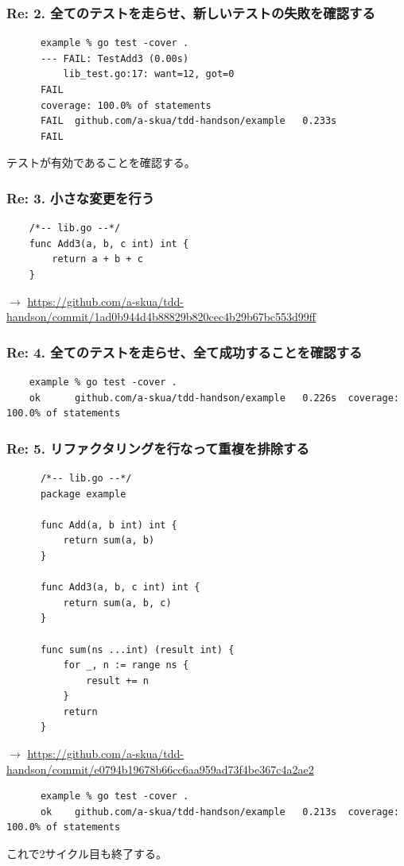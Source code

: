 \documentclass[aspectratio=169]{beamer}
\begin{document}
\begin{frame}[fragile]\frametitle{Re: 2. 全てのテストを走らせ、新しいテストの失敗を確認する}
  {
    \scriptsize
    \begin{verbatim}
      example % go test -cover .
      --- FAIL: TestAdd3 (0.00s)
          lib_test.go:17: want=12, got=0
      FAIL
      coverage: 100.0% of statements
      FAIL	github.com/a-skua/tdd-handson/example	0.233s
      FAIL
    \end{verbatim}
  }

  テストが有効であることを確認する。
\end{frame}

\begin{frame}[fragile]\frametitle{Re: 3. 小さな変更を行う}
  \scriptsize
  \begin{verbatim}
    /*-- lib.go --*/
    func Add3(a, b, c int) int {
        return a + b + c
    }
  \end{verbatim}

  $\rightarrow$
  \url{https://github.com/a-skua/tdd-handson/commit/1ad0b944d4b88829b820cec4b29b67bc553d99ff}
\end{frame}

\begin{frame}[fragile]\frametitle{Re: 4. 全てのテストを走らせ、全て成功することを確認する}
  \scriptsize
  \begin{verbatim}
    example % go test -cover .
    ok  	github.com/a-skua/tdd-handson/example	0.226s	coverage: 100.0% of statements
  \end{verbatim}
\end{frame}

\begin{frame}[fragile]\frametitle{Re: 5. リファクタリングを行なって重複を排除する}
  {
    \scriptsize
    \begin{verbatim}
      /*-- lib.go --*/
      package example

      func Add(a, b int) int {
          return sum(a, b)
      }

      func Add3(a, b, c int) int {
          return sum(a, b, c)
      }

      func sum(ns ...int) (result int) {
          for _, n := range ns {
              result += n
          }
          return
      }
    \end{verbatim}

    $\rightarrow$
    \url{https://github.com/a-skua/tdd-handson/commit/e0794b19678b66cc6aa959ad73f4be367c4a2ae2}
    \begin{verbatim}
      example % go test -cover .
      ok  	github.com/a-skua/tdd-handson/example	0.213s	coverage: 100.0% of statements
    \end{verbatim}
  }
  これで2サイクル目も終了する。
\end{frame}
\end{document}
